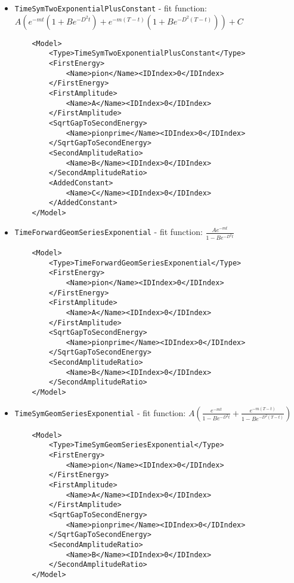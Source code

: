 \documentclass[12pt]{article}
\newcommand{\vb}{\texttt}
\begin{document}
\begin{itemize}
\item \vb{TimeSymTwoExponentialPlusConstant} - fit function: $A(e^{-mt}(1 + B e^{-D^2t} ) + e^{-m(T-t)}(1 + B e^{-D^2(T-t)})) + C$
\begin{verbatim}
    <Model>
        <Type>TimeSymTwoExponentialPlusConstant</Type>
        <FirstEnergy>
            <Name>pion</Name><IDIndex>0</IDIndex>
        </FirstEnergy>
        <FirstAmplitude>
            <Name>A</Name><IDIndex>0</IDIndex>
        </FirstAmplitude>
        <SqrtGapToSecondEnergy>
            <Name>pionprime</Name><IDIndex>0</IDIndex>
        </SqrtGapToSecondEnergy>
        <SecondAmplitudeRatio>
            <Name>B</Name><IDIndex>0</IDIndex>
        </SecondAmplitudeRatio>
        <AddedConstant>
            <Name>C</Name><IDIndex>0</IDIndex>
        </AddedConstant>
    </Model>
\end{verbatim}

\item \vb{TimeForwardGeomSeriesExponential} - fit function: $\frac{Ae^{-mt}}{1 - B e^{-D^2t}}$
\begin{verbatim}
    <Model>
        <Type>TimeForwardGeomSeriesExponential</Type>
        <FirstEnergy>
            <Name>pion</Name><IDIndex>0</IDIndex>
        </FirstEnergy>
        <FirstAmplitude>
            <Name>A</Name><IDIndex>0</IDIndex>
        </FirstAmplitude>
        <SqrtGapToSecondEnergy>
            <Name>pionprime</Name><IDIndex>0</IDIndex>
        </SqrtGapToSecondEnergy>
        <SecondAmplitudeRatio>
            <Name>B</Name><IDIndex>0</IDIndex>
        </SecondAmplitudeRatio>
    </Model>
\end{verbatim}

\item \vb{TimeSymGeomSeriesExponential} - fit function: $A\left(\frac{e^{-mt}}{1 - B e^{-D^2t}} + \frac{e^{-m(T-t)}}{1 - B e^{-D^2(T-t)}} \right)$
\begin{verbatim}
    <Model>
        <Type>TimeSymGeomSeriesExponential</Type>
        <FirstEnergy>
            <Name>pion</Name><IDIndex>0</IDIndex>
        </FirstEnergy>
        <FirstAmplitude>
            <Name>A</Name><IDIndex>0</IDIndex>
        </FirstAmplitude>
        <SqrtGapToSecondEnergy>
            <Name>pionprime</Name><IDIndex>0</IDIndex>
        </SqrtGapToSecondEnergy>
        <SecondAmplitudeRatio>
            <Name>B</Name><IDIndex>0</IDIndex>
        </SecondAmplitudeRatio>
    </Model>
\end{verbatim}
\end{itemize}
\end{document}
